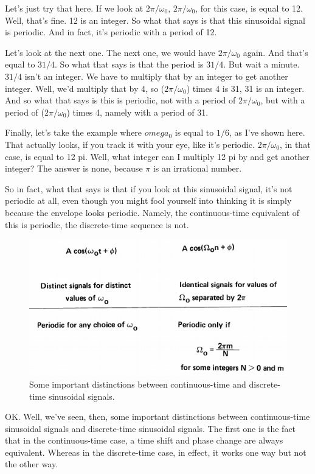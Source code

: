 \documentclass[fleqn,10pt]{olplainarticle}
\theoremstyle{definition}
\theoremstyle{remark}
\begin{document}
Let's just try that here. If we look at $2 \pi / \omega_0$, $2 \pi / \omega_0$, for this case, is equal to 12. Well, that's fine. 12 is an integer. So what that says is that this sinusoidal signal is periodic. And in fact, it's periodic with a period of 12.

Let's look at the next one. The next one, we would have $2 \pi / \omega_0$ again. And that's equal to $31/4$. So what that says is that the period is $31/4$. But wait a minute. $31/4$ isn't an integer. We have to multiply that by an integer to get another integer. Well, we'd multiply that by 4, so ($2 \pi / \omega_0$) times 4 is 31, 31 is an integer. And so what that says is this is periodic, not with a period of $2 \pi / \omega_0$, but with a period of ($2 \pi / \omega_0$) times 4, namely with a period of 31.

Finally, let's take the example where $omega_0$ is equal to $1/6$, as I've shown here. That actually looks, if you track it with your eye, like it's periodic. $2 \pi / \omega_0$, in that case, is equal to 12 pi. Well, what integer can I multiply 12 pi by and get another integer? The answer is none, because $\pi$ is an irrational number.

So in fact, what that says is that if you look at this sinusoidal signal, it's not periodic at all, even though you might fool yourself into thinking it is simply because the envelope looks periodic. Namely, the continuous-time equivalent of this is periodic, the discrete-time sequence is not.

\begin{figure}[ht]
	\centering
	\includegraphics[width=0.5\linewidth]{images/signals_12.png}
	\caption{Some important distinctions between continuous-time and discrete-time sinusoidal signals.}
	\label{fig:signals_12}
\end{figure}

OK. Well, we've seen, then, some important distinctions between continuous-time sinusoidal signals and discrete-time sinusoidal signals. The first one is the fact that in the continuous-time case, a time shift and phase change are always equivalent. Whereas in the discrete-time case, in effect, it works one way but not the other way.
\end{document}
